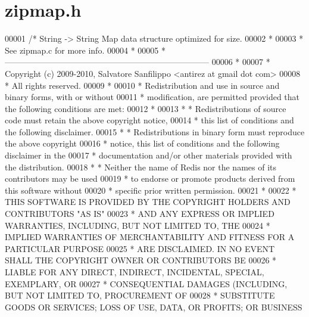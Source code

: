 \hypertarget{zipmap_8h_source}{}\section{zipmap.\+h}
\label{zipmap_8h_source}

\begin{DoxyCode}
00001 \textcolor{comment}{/* String -> String Map data structure optimized for size.}
00002 \textcolor{comment}{ *}
00003 \textcolor{comment}{ * See zipmap.c for more info.}
00004 \textcolor{comment}{ *}
00005 \textcolor{comment}{ * --------------------------------------------------------------------------}
00006 \textcolor{comment}{ *}
00007 \textcolor{comment}{ * Copyright (c) 2009-2010, Salvatore Sanfilippo <antirez at gmail dot com>}
00008 \textcolor{comment}{ * All rights reserved.}
00009 \textcolor{comment}{ *}
00010 \textcolor{comment}{ * Redistribution and use in source and binary forms, with or without}
00011 \textcolor{comment}{ * modification, are permitted provided that the following conditions are met:}
00012 \textcolor{comment}{ *}
00013 \textcolor{comment}{ *   * Redistributions of source code must retain the above copyright notice,}
00014 \textcolor{comment}{ *     this list of conditions and the following disclaimer.}
00015 \textcolor{comment}{ *   * Redistributions in binary form must reproduce the above copyright}
00016 \textcolor{comment}{ *     notice, this list of conditions and the following disclaimer in the}
00017 \textcolor{comment}{ *     documentation and/or other materials provided with the distribution.}
00018 \textcolor{comment}{ *   * Neither the name of Redis nor the names of its contributors may be used}
00019 \textcolor{comment}{ *     to endorse or promote products derived from this software without}
00020 \textcolor{comment}{ *     specific prior written permission.}
00021 \textcolor{comment}{ *}
00022 \textcolor{comment}{ * THIS SOFTWARE IS PROVIDED BY THE COPYRIGHT HOLDERS AND CONTRIBUTORS "AS IS"}
00023 \textcolor{comment}{ * AND ANY EXPRESS OR IMPLIED WARRANTIES, INCLUDING, BUT NOT LIMITED TO, THE}
00024 \textcolor{comment}{ * IMPLIED WARRANTIES OF MERCHANTABILITY AND FITNESS FOR A PARTICULAR PURPOSE}
00025 \textcolor{comment}{ * ARE DISCLAIMED. IN NO EVENT SHALL THE COPYRIGHT OWNER OR CONTRIBUTORS BE}
00026 \textcolor{comment}{ * LIABLE FOR ANY DIRECT, INDIRECT, INCIDENTAL, SPECIAL, EXEMPLARY, OR}
00027 \textcolor{comment}{ * CONSEQUENTIAL DAMAGES (INCLUDING, BUT NOT LIMITED TO, PROCUREMENT OF}
00028 \textcolor{comment}{ * SUBSTITUTE GOODS OR SERVICES; LOSS OF USE, DATA, OR PROFITS; OR BUSINESS}

\end{DoxyCode}
